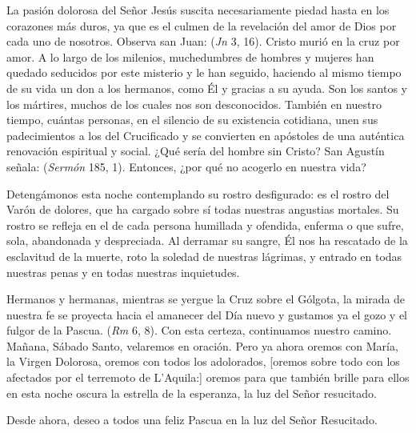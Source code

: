 \begin{body}
La pasión dolorosa del Señor Jesús suscita necesariamente piedad hasta en los corazones más duros, ya que es el culmen de la revelación del amor de Dios por cada uno de nosotros. Observa san Juan:  (\textit{Jn} 3, 16). Cristo murió en la cruz por amor. A lo largo de los milenios, muchedumbres de hombres y mujeres han quedado seducidos por este misterio y le han seguido, haciendo al mismo tiempo de su vida un don a los hermanos, como Él y gracias a su ayuda. Son los santos y los mártires, muchos de los cuales nos son desconocidos. También en nuestro tiempo, cuántas personas, en el silencio de su existencia cotidiana, unen sus padecimientos a los del Crucificado y se convierten en apóstoles de una auténtica renovación espiritual y social. ¿Qué sería del hombre sin Cristo? San Agustín señala:  (\textit{Sermón} 185, 1). Entonces, ¿por qué no acogerlo en nuestra vida?

Detengámonos esta noche contemplando su rostro desfigurado: es el rostro del Varón de dolores, que ha cargado sobre sí todas nuestras angustias mortales. Su rostro se refleja en el de cada persona humillada y ofendida, enferma o que sufre, sola, abandonada y despreciada. Al derramar su sangre, Él nos ha rescatado de la esclavitud de la muerte, roto la soledad de nuestras lágrimas, y entrado en todas nuestras penas y en todas nuestras inquietudes.

Hermanos y hermanas, mientras se yergue la Cruz sobre el Gólgota, la mirada de nuestra fe se proyecta hacia el amanecer del Día nuevo y gustamos ya el gozo y el fulgor de la Pascua.  (\textit{Rm} 6, 8). Con esta certeza, continuamos nuestro camino. Mañana, Sábado Santo, velaremos en oración. Pero ya ahora oremos con María, la Virgen Dolorosa, oremos con todos los adolorados, [oremos sobre todo con los afectados por el terremoto de L’Aquila:] oremos para que también brille para ellos en esta noche oscura la estrella de la esperanza, la luz del Señor resucitado.

Desde ahora, deseo a todos una feliz Pascua en la luz del Señor Resucitado.
\end{body}

